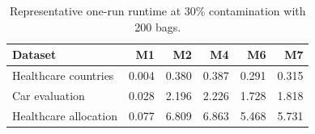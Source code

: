 \begin{table}[H]
\centering
\small
\caption{Representative one-run runtime at 30\% contamination with 200 bags.}
\label{tab:runtime}
\begin{tabular}{lrrrrr}
\toprule
Dataset & M1 & M2 & M4 & M6 & M7 \\
\midrule
Healthcare countries & 0.004 & 0.380 & 0.387 & 0.291 & 0.315 \\
Car evaluation & 0.028 & 2.196 & 2.226 & 1.728 & 1.818 \\
Healthcare allocation & 0.077 & 6.809 & 6.863 & 5.468 & 5.731 \\
\bottomrule
\end{tabular}
\end{table}
